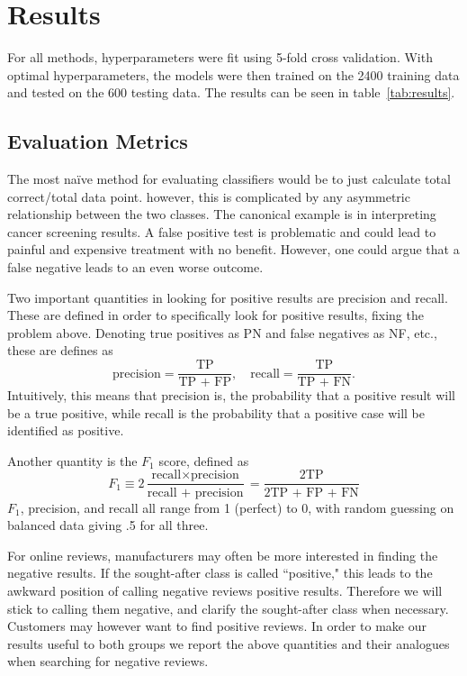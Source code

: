 \documentclass{article} %
\begin{document}
	\section{Results}
	
	For all methods, hyperparameters were fit using 5-fold cross validation. With optimal hyperparameters, the models were then trained on the 2400 training data and tested on the 600 testing data. The results can be seen in table~\ref{tab:results}.
	
	\subsection{Evaluation Metrics}
	
	The most na\"ive method for evaluating classifiers would be to just calculate total correct/total data point. however, this is complicated by any asymmetric relationship between the two classes. The canonical example is in interpreting cancer screening results. A false positive test is problematic and could lead to painful and expensive treatment with no benefit. However, one could argue that a false negative leads to an even worse outcome. 
	
	Two important quantities in looking for positive results are precision and recall. These are defined in order to specifically look for positive results, fixing the problem above. Denoting true positives as PN and false negatives as NF, etc., these are defines as 
	\begin{equation}
	\mbox{precision} = \frac{\mbox {TP}}{\mbox {TP + FP}},\quad \mbox{recall} = \frac{\mbox {TP}}{\mbox {TP + FN}}.
	\end{equation}
	Intuitively, this means that precision is, the probability that a positive result will be a true positive, while recall is the probability that a positive case will be identified as positive.
	
	Another quantity is the $F_1$ score, defined as
	\begin{equation}
	F_1 \equiv 2\frac{\mbox{recall}\times\mbox{precision}}{\mbox{recall +
			precision}} = \frac{\mbox{2TP}}{\mbox{2TP + FP + FN}}
	\end{equation}
	$F_1$, precision, and recall all range from 1 (perfect) to 0, with random guessing on balanced data giving .5 for all three.
	
	For online reviews, manufacturers may often be more interested in finding the negative results. If the sought-after class is called ``positive," this leads to the awkward position of calling negative reviews positive results. Therefore we will stick to calling them negative, and clarify the sought-after class when necessary. Customers may however want to find positive reviews. In order to make our results useful to both groups we report the above quantities and their analogues when searching for negative reviews.
	
\end{document}
